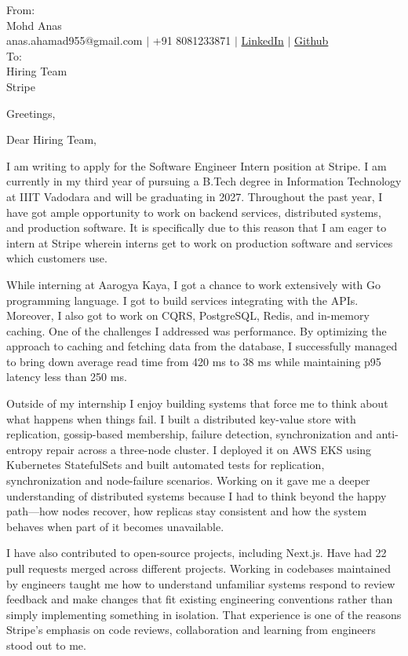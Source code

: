 \documentclass[10.5pt]{letter}
\begin{document}
\begin{letter}{
  From: \\
  Mohd  Anas \\
  anas.ahamad955@gmail.com $|$ +91 8081233871 $|$ \href{https://linkedin.com/in/anas-um}{LinkedIn} $|$ \href{https://github.com/Anas-github-acc}{Github} \\
  To: \\
  Hiring Team \\
  Stripe
}

\opening{Greetings,}
Dear Hiring Team,

I am writing to apply for the Software Engineer Intern position at Stripe. I am currently in my third year of pursuing a B.Tech degree in Information Technology at IIIT Vadodara and will be graduating in 2027. Throughout the past year, I have got ample opportunity to work on backend services, distributed systems, and production software. It is specifically due to this reason that I am eager to intern at Stripe wherein interns get to work on production software and services which customers use.

While interning at Aarogya Kaya, I got a chance to work extensively with Go programming language. I got to build services integrating with the APIs. Moreover, I also got to work on CQRS, PostgreSQL, Redis, and in-memory caching. One of the challenges I addressed was performance. By optimizing the approach to caching and fetching data from the database, I successfully managed to bring down average read time from 420 ms to 38 ms while maintaining p95 latency less than 250 ms.

Outside of my internship I enjoy building systems that force me to think about what happens when things fail. I built a distributed key-value store with replication, gossip-based membership, failure detection, synchronization and anti-entropy repair across a three-node cluster. I deployed it on AWS EKS using Kubernetes StatefulSets and built automated tests for replication, synchronization and node-failure scenarios. Working on it gave me a deeper understanding of distributed systems because I had to think beyond the happy path—how nodes recover, how replicas stay consistent and how the system behaves when part of it becomes unavailable.

I have also contributed to open-source projects, including Next.js. Have had 22 pull requests merged across different projects. Working in codebases maintained by engineers taught me how to understand unfamiliar systems respond to review feedback and make changes that fit existing engineering conventions rather than simply implementing something in isolation. That experience is one of the reasons Stripe’s emphasis on code reviews, collaboration and learning from engineers stood out to me.


\end{letter}
\end{document}
